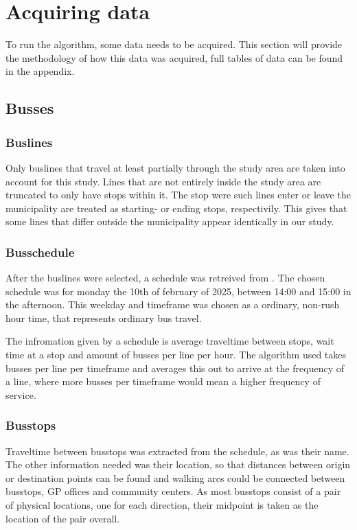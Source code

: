 \chapter{Acquiring data}\label{sec:acquiringdata}
To run the algorithm, some data needs to be acquired. This section will provide the methodology of how this data was acquired, full tables of data can be found in the appendix.
\section{Busses}

\subsection{Buslines}
Only buslines that travel at least partially through the study area are taken into account for this study. Lines that are not entirely inside the study area are truncated to only have stops within it. The stop were such lines enter or leave the municipality are treated as starting- or ending stops, respectivily. This gives that some lines that differ outside the municipality appear identically in our study.
\subsection{Busschedule}
After the buslines were selected, a schedule was retreived from \cite{Qbuzz}. The chosen schedule was for monday the 10th of february of 2025, between 14:00 and 15:00 in the afternoon. This weekday and timeframe was chosen as a ordinary, non-rush hour time, that represents ordinary bus travel.

The infromation given by a schedule is average traveltime between stops, wait time at a stop and amount of busses per line per hour. The algorithm used takes busses per line per timeframe and averages this out to arrive at the frequency of a line, where more busses per timeframe would mean a higher frequency of service.

\subsection{Busstops}
Traveltime between busstops was extracted from the schedule, as was their name. The other information needed was their location, so that distances between origin or destination points can be found and walking arcs could be connected between busstops, GP offices and community centers. As most busstops consist of a pair of physical locations, one for each direction, their midpoint is taken as the location of the pair overall.

